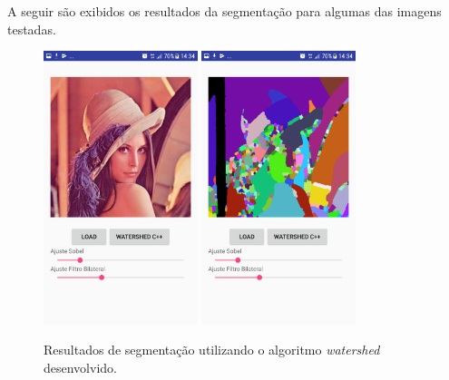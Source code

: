 A seguir são exibidos os resultados da segmentação para algumas das imagens testadas.
\begin{figure}[!htb]
 \centering
 \def\baselinestretch{1}\small\normalsize
 \includegraphics[width=0.4\textwidth]{img/imagem_watershed_desenvolvido_app_n1.png}\qquad
 \includegraphics[width=0.4\textwidth]{img/resultado_watershed_desenvolvido_app_n1.png} 
 \caption{\label{fig:resultado_watershed_desenvolvido_app_p1}Resultados de segmentação utilizando o algoritmo \textit{watershed} desenvolvido.}
\end{figure}
